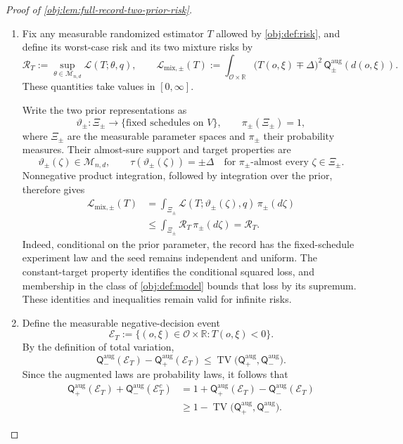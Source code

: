 \documentclass[11pt]{article}
\begin{document}
\begin{proof}[Proof of \cref{obj:lem:full-record-two-prior-risk}]
\begin{enumerate}
\item Fix any measurable randomized estimator \(T\) allowed by
\cref{obj:def:risk}, and define its worst-case risk and its two mixture risks by
\[
\mathcal R_T
:=
\sup_{\theta\in\mathcal M_{n,d}}\mathcal L(T;\theta,q),
\qquad
\mathcal L_{\mathrm{mix},\pm}(T)
:=
\int_{\mathcal O\times\mathbb R}
\bigl(T(o,\xi)\mp\Delta\bigr)^2\,
\mathsf Q_\pm^{\mathrm{aug}}(d(o,\xi)).
\]
These quantities take values in \([0,\infty]\).

Write the two prior representations as
\[
\vartheta_\pm:\Xi_\pm\longrightarrow
\{\text{fixed schedules on }V\},
\qquad
\pi_\pm(\Xi_\pm)=1,
\]
where \(\Xi_\pm\) are the measurable parameter spaces and \(\pi_\pm\) their probability measures. Their almost-sure support and target properties are
\[
\vartheta_\pm(\zeta)\in\mathcal M_{n,d},
\qquad
\tau(\vartheta_\pm(\zeta))=\pm\Delta
\quad\text{for }\pi_\pm\text{-almost every }\zeta\in\Xi_\pm.
\]
Nonnegative product integration, followed by integration over the prior, therefore gives
\[
\begin{aligned}
\mathcal L_{\mathrm{mix},\pm}(T)
&=
\int_{\Xi_\pm}
\mathcal L(T;\vartheta_\pm(\zeta),q)\,\pi_\pm(d\zeta)\\
&\le
\int_{\Xi_\pm}\mathcal R_T\,\pi_\pm(d\zeta)
=
\mathcal R_T.
\end{aligned}
\]
Indeed, conditional on the prior parameter, the record has the fixed-schedule experiment law and the seed remains independent and uniform. The constant-target property identifies the conditional squared loss, and membership in the class of \cref{obj:def:model} bounds that loss by its supremum. These identities and inequalities remain valid for infinite risks.

\item Define the measurable negative-decision event
\[
\mathcal E_T
:=
\{(o,\xi)\in\mathcal O\times\mathbb R:T(o,\xi)<0\}.
\]
By the definition of total variation,
\[
\mathsf Q_-^{\mathrm{aug}}(\mathcal E_T)
-\mathsf Q_+^{\mathrm{aug}}(\mathcal E_T)
\le
\operatorname{TV}
\bigl(\mathsf Q_+^{\mathrm{aug}},\mathsf Q_-^{\mathrm{aug}}\bigr).
\]
Since the augmented laws are probability laws, it follows that
\[
\begin{aligned}
\mathsf Q_+^{\mathrm{aug}}(\mathcal E_T)
+\mathsf Q_-^{\mathrm{aug}}(\mathcal E_T^c)
&=
1+\mathsf Q_+^{\mathrm{aug}}(\mathcal E_T)
-\mathsf Q_-^{\mathrm{aug}}(\mathcal E_T)\\
&\ge
1-\operatorname{TV}
\bigl(\mathsf Q_+^{\mathrm{aug}},\mathsf Q_-^{\mathrm{aug}}\bigr).
\end{aligned}
\]


\end{enumerate}
\end{proof}
\end{document}

